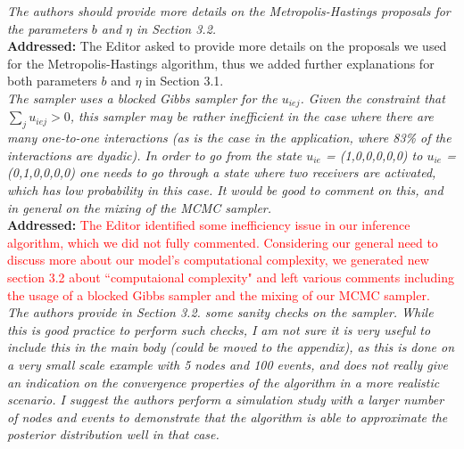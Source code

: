 \documentclass[12pt]{article}
\newcommand{\grey}[1]{{\color{mygrey}#1}}
\theoremstyle{definition}
\begin{document}
 \grey{\emph{The authors should provide more details on the Metropolis-Hastings
proposals for the parameters $b$ and $\eta$ in Section 3.2. }}\\

\noindent \textcolor{MyGreen}{\textbf{Addressed:}} The Editor asked to provide more details on the proposals we used for the Metropolis-Hastings algorithm, thus we added further explanations for both parameters $b$ and $\eta$ in Section 3.1.\\


 \grey{\emph{The sampler uses a blocked Gibbs sampler for the $u_{iej}$. Given the constraint that $\sum_j u_{iej} > 0$, this sampler may be rather inefficient in the case where there are many one-to-one interactions (as is the case in the application, where 83\% of the interactions are dyadic). In order to go from the state $u_{ie}$ = (1,0,0,0,0,0) to $u_{ie}$ = (0,1,0,0,0,0) one needs to go through a state where two receivers are activated, which has low probability in this case. It would be good to comment on this, and in general on the mixing of the MCMC sampler. }}\\

\noindent \textcolor{MyGreen}{\textbf{Addressed:}} \textcolor{red}{The Editor identified some inefficiency issue in our inference algorithm, which we did not fully commented. Considering our general need to discuss more about our model's computational complexity, we generated new section 3.2 about ``computaional complexity" and left various comments including the usage of a blocked Gibbs sampler and the mixing of our MCMC sampler.}\\


 \grey{\emph{The authors provide in Section 3.2. some sanity checks on the sampler. While this is good practice to perform such checks, I am not sure it is very useful to include this in the main body (could be moved to the appendix), as this is done on a very small scale example with 5 nodes and 100 events, and does not really give an indication on the convergence properties of the algorithm in a more realistic scenario. I suggest the authors perform a simulation study with a larger number of nodes and events to demonstrate that the algorithm is able to approximate the posterior distribution well in that case.
}}\\
\end{document}
